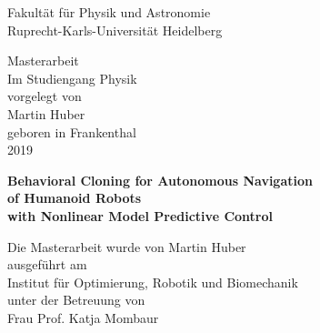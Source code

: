
\thispagestyle{empty}
\begin{center}
  \renewcommand{\baselinestretch}{2.00}
  \Large\sffamily
  Fakult\"{a}t f\"{u}r Physik und Astronomie\\
  \large
  Ruprecht-Karls-Universit\"{a}t Heidelberg
  \par\vfill\normalfont
  Masterarbeit\\
  Im Studiengang Physik\\
  vorgelegt von\\
  Martin Huber\\
  geboren in Frankenthal\\
  2019\\
\end{center}
\newpage

\thispagestyle{empty}
\begin{center}
  \renewcommand{\baselinestretch}{2.00}
  \Large\bfseries\sffamily
    Behavioral Cloning for Autonomous Navigation\\
    of Humanoid Robots \\
    with Nonlinear Model Predictive Control
  \par
  \vfill
  \large\normalfont
  Die Masterarbeit wurde von Martin Huber\\
  ausgeführt am\\
  Institut für Optimierung, Robotik und Biomechanik\\
  unter der Betreuung von\\
  Frau Prof. Katja Mombaur
\end{center}\par
\vspace{5\baselineskip}

\renewcommand{\baselinestretch}{1.00}\normalsize